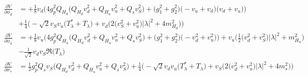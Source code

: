 \begin{align} 
\frac{\partial V}{\partial \phi_{d}} &= +\frac{1}{8} v_d \Big(4 g_{p}^{2} Q_{H_d} \Big(Q_{H_d} v_{d}^{2}  + Q_{H_u} v_{u}^{2}  + Q_s v_{S}^{2} \Big) + \Big(g_{1}^{2} + g_{2}^{2}\Big)\Big(- v_u  + v_d\Big)\Big(v_d + v_u\Big)\Big)\nonumber \\ 
 &+\frac{1}{4} \Big(- \sqrt{2} v_S v_u \Big(T_{\lambda}^* + T_{\lambda}\Big) + v_d \Big(2 \Big(v_{S}^{2} + v_{u}^{2}\Big)|\lambda|^2  + 4 m_{H_d}^2 \Big)\Big)\\ 
\frac{\partial V}{\partial \phi_{u}} &= +\frac{1}{8} v_u \Big(4 g_{p}^{2} Q_{H_u} \Big(Q_{H_d} v_{d}^{2}  + Q_{H_u} v_{u}^{2}  + Q_s v_{S}^{2} \Big) + \Big(g_{1}^{2} + g_{2}^{2}\Big)\Big(- v_{d}^{2}  + v_{u}^{2}\Big)\Big)+v_u \Big(\frac{1}{2} \Big(v_{d}^{2} + v_{S}^{2}\Big)|\lambda|^2  + m_{H_u}^2\Big)\nonumber \\ 
 &- \frac{1}{\sqrt{2}} v_d v_S {\Re\Big(T_{\lambda}\Big)} \\ 
\frac{\partial V}{\partial \sigma_s} &= \frac{1}{2} g_{p}^{2} Q_s v_S \Big(Q_{H_d} v_{d}^{2}  + Q_{H_u} v_{u}^{2}  + Q_s v_{S}^{2} \Big) + \frac{1}{4} \Big(- \sqrt{2} v_d v_u \Big(T_{\lambda}^* + T_{\lambda}\Big) + v_S \Big(2 \Big(v_{d}^{2} + v_{u}^{2}\Big)|\lambda|^2  + 4 m^2_{s} \Big)\Big)
\end{align} 
